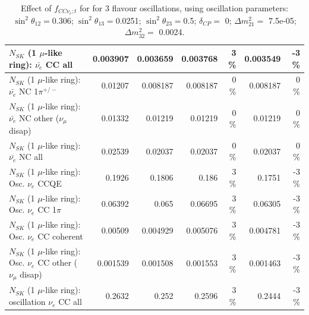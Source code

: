 \begin{table}
\begin{tabular}{| l | r | r | r  r | r  r |}
                            $N_{SK}$ (1 $\mu$-like ring): $\bar{\nu_{e}}$ CC all &        0.003907 &        0.003659 &        0.003768 &        3 \%  &        0.003549 &       -3 \%  \\ 
\hline
                     $N_{SK}$ (1 $\mu$-like ring): $\bar{\nu_e}$ NC 1$\pi^{+/-}$ &         0.01207 &        0.008187 &        0.008187 &        0 \%  &        0.008187 &        0 \%  \\ 
          $N_{SK}$ (1 $\mu$-like ring): $\bar{\nu_e}$ NC other ($\nu_\mu$ disap) &         0.01332 &         0.01219 &         0.01219 &        0 \%  &         0.01219 &        0 \%  \\ 
                            $N_{SK}$ (1 $\mu$-like ring): $\bar{\nu_{e}}$ NC all &         0.02539 &         0.02037 &         0.02037 &        0 \%  &         0.02037 &        0 \%  \\ 
\hline
\hline
\hline
                                 $N_{SK}$ (1 $\mu$-like ring): Osc. $\nu_e$ CCQE &          0.1926 &          0.1806 &           0.186 &        3 \%  &          0.1751 &       -3 \%  \\ 
                            $N_{SK}$ (1 $\mu$-like ring): Osc. $\nu_e$ CC 1$\pi$ &         0.06392 &           0.065 &         0.06695 &        3 \%  &         0.06305 &       -3 \%  \\ 
                          $N_{SK}$ (1 $\mu$-like ring): Osc. $\nu_e$ CC coherent &         0.00509 &        0.004929 &        0.005076 &        3 \%  &        0.004781 &       -3 \%  \\ 
           $N_{SK}$ (1 $\mu$-like ring): Osc. $\nu_e$ CC other ($\nu_\mu$ disap) &        0.001539 &        0.001508 &        0.001553 &        3 \%  &        0.001463 &       -3 \%  \\ 
                        $N_{SK}$ (1 $\mu$-like ring): oscillation $\nu_e$ CC all &          0.2632 &           0.252 &          0.2596 &        3 \%  &          0.2444 &       -3 \%  \\ 
\hline
\hline
\end{tabular}
\caption{ Effect of $f_{CC\nu_e; t}$ for for 3 flavour oscillations, using oscillation parameters:  $\sin^2\theta_{12} = $0.306; $\sin^2\theta_{13} = $0.0251; $\sin^2\theta_{23} = $0.5; $\delta_{CP} = $        0; $\Delta m^2_{21} = $    7.5e-05; $\Delta m^2_{32} = $    0.0024. }
\label{tab:num_xsec_norm_nuetonumu_1RmuT_3f_osc_t13:0.0251}
\end{table}
\clearpage
